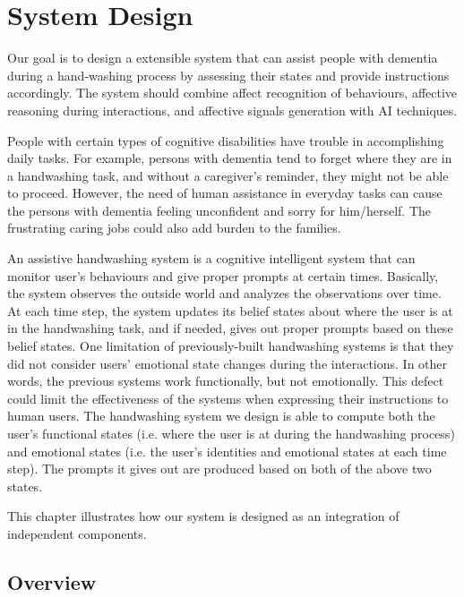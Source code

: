 \chapter{System Design}
\label{chap:design}

Our goal is to design a extensible system that can assist people with dementia during a hand-washing process by assessing their states and provide instructions accordingly. The system should combine affect recognition of behaviours, affective reasoning during interactions, and affective signals generation with AI techniques.

People with certain types of cognitive disabilities have trouble in accomplishing daily tasks. For example, persons with dementia tend to forget where they are in a handwashing task, and without a caregiver's reminder, they might not be able to proceed. However, the need of human assistance in everyday tasks can cause the persons with dementia feeling unconfident and sorry for him/herself. The frustrating caring jobs could also add burden to the families.

An assistive handwashing system is a cognitive intelligent system that can monitor user's behaviours and give proper prompts at certain times. Basically, the system observes the outside world and analyzes the observations over time. At each time step, the system updates its belief states about where the user is at in the handwashing task, and if needed, gives out proper prompts based on these belief states. One limitation of previously-built handwashing systems is that they did not consider users' emotional state changes during the interactions. In other words, the previous systems work functionally, but not emotionally. This defect could limit the effectiveness of the systems when expressing their instructions to human users. The handwashing system we design is able to compute both the user's functional states (i.e. where the user is at during the handwashing process) and emotional states (i.e. the user's identities and emotional states at each time step). The prompts it gives out are produced based on both of the above two states. 

This chapter illustrates how our system is designed as an integration of independent components. 

\section{Overview}

